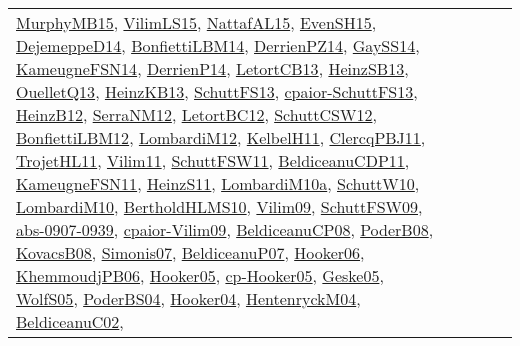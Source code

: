 {\begin{longtable}{lp{3cm}>{\raggedright}p{6cm}>{\raggedright}p{6cm}p{8cm}}
\href{papers/MurphyMB15.pdf}{MurphyMB15}\cite{MurphyMB15}, \href{papers/VilimLS15.pdf}{VilimLS15}\cite{VilimLS15}, \href{articles/NattafAL15.pdf}{NattafAL15}\cite{NattafAL15}, \href{papers/EvenSH15.pdf}{EvenSH15}\cite{EvenSH15}, \href{papers/DejemeppeD14.pdf}{DejemeppeD14}\cite{DejemeppeD14}, \href{articles/BonfiettiLBM14.pdf}{BonfiettiLBM14}\cite{BonfiettiLBM14}, \href{papers/DerrienPZ14.pdf}{DerrienPZ14}\cite{DerrienPZ14}, \href{papers/GaySS14.pdf}{GaySS14}\cite{GaySS14}, \href{articles/KameugneFSN14.pdf}{KameugneFSN14}\cite{KameugneFSN14}, \href{papers/DerrienP14.pdf}{DerrienP14}\cite{DerrienP14}, \href{papers/LetortCB13.pdf}{LetortCB13}\cite{LetortCB13}, \href{articles/HeinzSB13.pdf}{HeinzSB13}\cite{HeinzSB13}, \href{papers/OuelletQ13.pdf}{OuelletQ13}\cite{OuelletQ13}, \href{papers/HeinzKB13.pdf}{HeinzKB13}\cite{HeinzKB13}, \href{papers/SchuttFS13.pdf}{SchuttFS13}\cite{SchuttFS13}, \href{papers/cpaior-SchuttFS13.pdf}{cpaior-SchuttFS13}\cite{cpaior-SchuttFS13}, \href{papers/HeinzB12.pdf}{HeinzB12}\cite{HeinzB12}, \href{papers/SerraNM12.pdf}{SerraNM12}\cite{SerraNM12}, \href{papers/LetortBC12.pdf}{LetortBC12}\cite{LetortBC12}, \href{papers/SchuttCSW12.pdf}{SchuttCSW12}\cite{SchuttCSW12}, \href{papers/BonfiettiLBM12.pdf}{BonfiettiLBM12}\cite{BonfiettiLBM12}, \href{articles/LombardiM12.pdf}{LombardiM12}\cite{LombardiM12}, \href{articles/KelbelH11.pdf}{KelbelH11}\cite{KelbelH11}, \href{papers/ClercqPBJ11.pdf}{ClercqPBJ11}\cite{ClercqPBJ11}, \href{articles/TrojetHL11.pdf}{TrojetHL11}\cite{TrojetHL11}, \href{papers/Vilim11.pdf}{Vilim11}\cite{Vilim11}, \href{articles/SchuttFSW11.pdf}{SchuttFSW11}\cite{SchuttFSW11}, \href{articles/BeldiceanuCDP11.pdf}{BeldiceanuCDP11}\cite{BeldiceanuCDP11}, \href{papers/KameugneFSN11.pdf}{KameugneFSN11}\cite{KameugneFSN11}, \href{papers/HeinzS11.pdf}{HeinzS11}\cite{HeinzS11}, \href{articles/LombardiM10a.pdf}{LombardiM10a}\cite{LombardiM10a}, \href{papers/SchuttW10.pdf}{SchuttW10}\cite{SchuttW10}, \href{papers/LombardiM10.pdf}{LombardiM10}\cite{LombardiM10}, \href{papers/BertholdHLMS10.pdf}{BertholdHLMS10}\cite{BertholdHLMS10}, \href{papers/Vilim09.pdf}{Vilim09}\cite{Vilim09}, \href{papers/SchuttFSW09.pdf}{SchuttFSW09}\cite{SchuttFSW09}, \href{articles/abs-0907-0939.pdf}{abs-0907-0939}\cite{abs-0907-0939}, \href{papers/cpaior-Vilim09.pdf}{cpaior-Vilim09}\cite{cpaior-Vilim09}, \href{papers/BeldiceanuCP08.pdf}{BeldiceanuCP08}\cite{BeldiceanuCP08}, \href{papers/PoderB08.pdf}{PoderB08}\cite{PoderB08}, \href{articles/KovacsB08.pdf}{KovacsB08}\cite{KovacsB08}, \href{articles/Simonis07.pdf}{Simonis07}\cite{Simonis07}, \href{papers/BeldiceanuP07.pdf}{BeldiceanuP07}\cite{BeldiceanuP07}, \href{articles/Hooker06.pdf}{Hooker06}\cite{Hooker06}, \href{papers/KhemmoudjPB06.pdf}{KhemmoudjPB06}\cite{KhemmoudjPB06}, \href{articles/Hooker05.pdf}{Hooker05}\cite{Hooker05}, \href{papers/cp-Hooker05.pdf}{cp-Hooker05}\cite{cp-Hooker05}, \href{papers/Geske05.pdf}{Geske05}\cite{Geske05}, \href{papers/WolfS05.pdf}{WolfS05}\cite{WolfS05}, \href{articles/PoderBS04.pdf}{PoderBS04}\cite{PoderBS04}, \href{papers/Hooker04.pdf}{Hooker04}\cite{Hooker04}, \href{papers/HentenryckM04.pdf}{HentenryckM04}\cite{HentenryckM04}, \href{papers/BeldiceanuC02.pdf}{BeldiceanuC02}\cite{BeldiceanuC02}, 
\end{longtable}}
